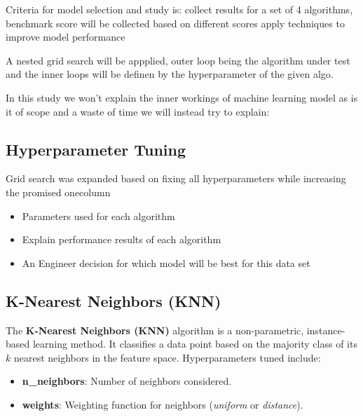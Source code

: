 \documentclass{article}
\begin{document}
Criteria for model selection and study is: collect results for a set of 4 algorithms, benchmark score will be collected based
on different scores apply techniques to improve model performance

A nested grid search will be appplied, outer loop being the algorithm under test and the inner loops will 
be definen by the hyperparameter of the given algo.

In this study we won't explain the inner workings of machine learning model
as is it of scope and a waste of time we will instead try to explain:

\subsection{Hyperparameter Tuning}
Grid search was expanded based on fixing all hyperparameters 
while increasing the promised onecolumn

\begin{itemize}
    \item Parameters used for each algorithm
    \item Explain performance results of each algorithm 
    \item An Engineer decision for which model will be best for this data set 
\end{itemize}

\subsection{K-Nearest Neighbors (KNN)}
The \textbf{K-Nearest Neighbors (KNN)} algorithm is a non-parametric, instance-based learning method. It classifies a data point based on the majority class of its $k$ nearest neighbors in the feature space. Hyperparameters tuned include:
\begin{itemize}
    \item \textbf{n\_neighbors}: Number of neighbors considered.
    \item \textbf{weights}: Weighting function for neighbors (\textit{uniform} or \textit{distance}).
\end{itemize}
\end{document}
